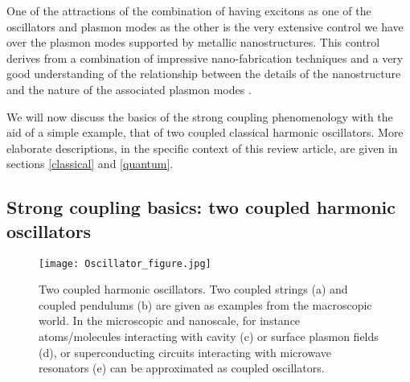 \documentclass[12pt]{iopart}
\begin{document}
One of the attractions of the combination of having excitons as one of the oscillators and plasmon modes as the other is the very extensive control we have over the plasmon modes supported by metallic nanostructures. This control derives from a combination of impressive nano-fabrication techniques \cite{Gates_ChemRev_2005_105_1171} and a very good understanding of the relationship between the details of the nanostructure and the nature of the associated plasmon modes \cite{Kern_ACSNano_2012_6_9828}.

We will now discuss the basics of the strong coupling phenomenology with the aid of a simple example, that of two coupled classical harmonic oscillators. More elaborate descriptions, in the specific context of this review article, are given in sections \ref{classical} and \ref{quantum}.

\subsection{Strong coupling basics: two coupled harmonic oscillators}

\begin{figure}
\texttt{[image: Oscillator\_figure.jpg]}
\caption{Two coupled harmonic oscillators. Two coupled strings (a) and coupled pendulums (b) are given as examples from the macroscopic world. In the microscopic and nanoscale, for instance atoms/molecules interacting with cavity (c) or surface plasmon fields (d), or superconducting circuits interacting with microwave resonators (e) can be approximated as coupled oscillators.}
\label{oscillatorfigure}
\end{figure}
\end{document}
